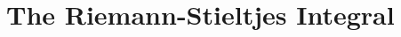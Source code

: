 \documentclass[../../templates/chapter]{subfiles}
\begin{document}
\chapter{The Riemann-Stieltjes Integral}\label{chap:06-the-riemann-stieltjes-integral}










\end{document}
